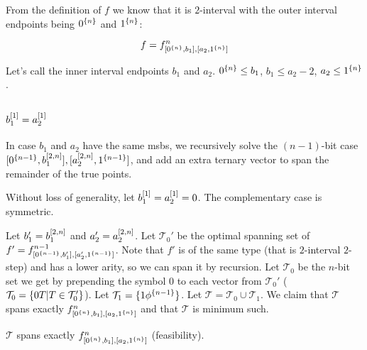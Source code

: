 From the definition of $f$ we know that it is $2$-interval
with the outer interval endpoints being
$0^{\{n\}}$ and $1^{\{n\}}$:

\[
f = f^n_{[0^{\{n\}}, b_1],
[a_2, 1^{\{n\}}]}
\]

Let's call the inner interval endpoints $b_1$ and $a_2$.
$0^{\{n\}} \leq b_1$,
$b_1 \leq a_2 - 2$,
$a_2 \leq 1^{\{n\}}$.

\subsection{\texorpdfstring{$b_1^{[1]} = a_2^{[1]}$}
{b1[1] = a2[1]}
}

In case $b_1$ and $a_2$ have the same \acrshort{msb}s,
we recursively solve the $(n-1)$-bit
case
$[0^{\{n-1\}}, b_1^{[2, n]}],
[a_2^{[2, n]}, 1^{\{n-1\}}]$,
and add an extra ternary vector to span the remainder
of the true points.

Without loss of generality,
let $b_1^{[1]} = a_2^{[1]} = 0$.
The complementary case is symmetric.

Let $b_1' = b_1^{[2, n]}$
and $a_2' = a_2^{[2, n]}$.
Let $\mathcal{T}_0'$ be the optimal spanning set of
$f' = f^{n-1}_{[0^{\{n-1\}}, b_1'],
[a_2', 1^{\{n-1\}}]}$.
Note that $f'$ is of the same type
(that is $2$-interval $2$-step)
and has a lower arity,
so we can span it by recursion.
Let $\mathcal{T}_0$ be the $n$-bit set we get
by prepending the symbol $0$
to each vector from $\mathcal{T}_0'$
($\mathcal{T}_0 = \{0 T | T \in \mathcal{T}_0'\}$).
Let $\mathcal{T}_1 = \{1 \phi^{\{n-1\}}\}$.
Let $\mathcal{T} = \mathcal{T}_0 \cup \mathcal{T}_1$.
We claim that $\mathcal{T}$ spans exactly
$f^n_{[0^{\{n\}}, b_1],
[a_2, 1^{\{n\}}]}$
and that $\mathcal{T}$ is minimum such.

\begin{theorem}
$\mathcal{T}$ spans exactly
$f^n_{[0^{\{n\}}, b_1],
[a_2, 1^{\{n\}}]}$ (feasibility).
\end{theorem}

